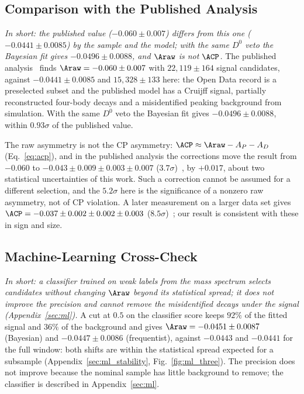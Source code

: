 \subsection{Comparison with the Published Analysis}
\label{sec:comparison_published}
\emph{In short: the published value ($-0.060\pm0.007$) differs from this one ($-0.0441\pm0.0085$) by the sample and the model; with the same $D^0$ veto the Bayesian fit gives $-0.0496\pm0.0088$, and $\Araw$ is not $\ACP$.}
The published analysis~\cite{lhcb_cpv_2013} finds $\Araw=-0.060\pm0.007$ with $22{,}119\pm164$ signal candidates, against $-0.0441\pm0.0085$ and $15{,}328\pm133$ here: the Open Data record is a preselected subset and the published model has a Cruijff signal, partially reconstructed four-body decays and a misidentified peaking background from simulation. With the same $D^0$ veto the Bayesian fit gives $-0.0496\pm0.0088$, within $0.93\sigma$ of the published value.

The raw asymmetry is not the CP asymmetry: $\ACP\approx\Araw-A_P-A_D$ (Eq.~\eqref{eq:acp}), and in the published analysis the corrections move the result from $-0.060$ to $-0.043\pm0.009\pm0.003\pm0.007$ ($3.7\sigma$)~\cite{lhcb_cpv_2013}, by $+0.017$, about two statistical uncertainties of this work. Such a correction cannot be assumed for a different selection, and the $5.2\sigma$ here is the significance of a nonzero raw asymmetry, not of CP violation. A later measurement on a larger data set gives $\ACP=-0.037\pm0.002\pm0.002\pm0.003$ ($8.5\sigma$)~\cite{lhcb_cpv_prd2023,lhcb_cpv_paper}; our result is consistent with these in sign and size.

\subsection{Machine-Learning Cross-Check}
\label{sec:comparison_mlcheck}
\emph{In short: a classifier trained on weak labels from the mass spectrum selects candidates without changing $\Araw$ beyond its statistical spread; it does not improve the precision and cannot remove the misidentified decays under the signal (Appendix~\ref{sec:ml}).}
A cut at $0.5$ on the classifier score keeps $92\%$ of the fitted signal and $36\%$ of the background and gives $\Araw=-0.0451\pm0.0087$ (Bayesian) and $-0.0447\pm0.0086$ (frequentist), against $-0.0443$ and $-0.0441$ for the full window: both shifts are within the statistical spread expected for a subsample (Appendix~\ref{sec:ml_stability}, Fig.~\ref{fig:ml_three}). The precision does not improve because the nominal sample has little background to remove; the classifier is described in Appendix~\ref{sec:ml}.

